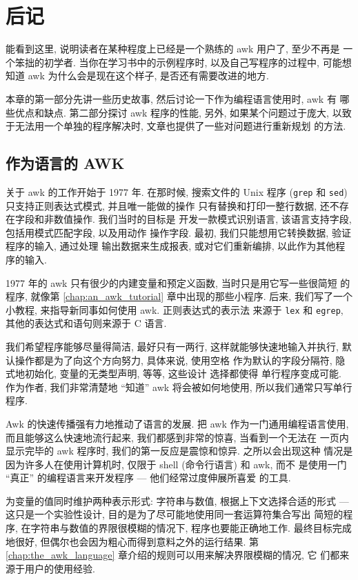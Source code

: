 \chapter{后记}
\label{chap:epilog}

能看到这里, 说明读者在某种程度上已经是一个熟练的 awk 用户了, 至少不再是
一个笨拙的初学者. 当你在学习书中的示例程序时, 以及自己写程序的过程中, 
可能想知道 awk 为什么会是现在这个样子, 是否还有需要改进的地方.

本章的第一部分先讲一些历史故事, 然后讨论一下作为编程语言使用时, awk 有
哪些优点和缺点. 第二部分探讨 awk 程序的性能, 另外, 如果某个问题过于庞大,
以致于无法用一个单独的程序解决时, 文章也提供了一些对问题进行重新规划
的方法.

\section{作为语言的 AWK}
\label{sec:awk_as_a_language}

关于 awk 的工作开始于 1977 年. 在那时候, 搜索文件的 Unix 程序
(\texttt{grep} 和 \texttt{sed}) 只支持正则表达式模式, 并且唯一能做的操作
只有替换和打印一整行数据, 还不存在字段和非数值操作. 我们当时的目标是
开发一款模式识别语言, 该语言支持字段, 包括用模式匹配字段, 以及用动作
操作字段. 最初, 我们只能想用它转换数据, 验证程序的输入, 通过处理
输出数据来生成报表, 或对它们重新编排, 以此作为其他程序的输入.

1977 年的 awk 只有很少的内建变量和预定义函数, 当时只是用它写一些很简短
的程序, 就像第 \ref{chap:an_awk_tutorial} 章中出现的那些小程序. 后来,
我们写了一个小教程, 来指导新同事如何使用 awk. 正则表达式的表示法
来源于 \texttt{lex} 和 \texttt{egrep}, 其他的表达式和语句则来源于 C
语言.

我们希望程序能够尽量得简洁, 最好只有一两行, 这样就能够快速地输入并执行,
    默认操作都是为了向这个方向努力, 具体来说, 使用空格
作为默认的字段分隔符, 隐式地初始化, 变量的无类型声明, 等等, 这些设计
选择都使得 单行程序变成可能. 作为作者, 我们非常清楚地 ``知道'' awk
将会被如何地使用, 所以我们通常只写单行程序.

Awk 的快速传播强有力地推动了语言的发展. 把 awk 作为一门通用编程语言使用,
而且能够这么快速地流行起来, 我们都感到非常的惊喜, 当看到一个无法在
一页内显示完毕的 awk 程序时, 我们的第一反应是震惊和惊异. 之所以会出现这种
情况是因为许多人在使用计算机时, 仅限于 shell (命令行语言) 和 awk, 而不
是使用一门 ``真正'' 的编程语言来开发程序 --- 他们经常过度伸展所喜爱
的工具.

为变量的值同时维护两种表示形式: 字符串与数值, 根据上下文选择合适的形式
--- 这只是一个实验性设计, 目的是为了尽可能地使用同一套运算符集合写出
简短的程序, 在字符串与数值的界限很模糊的情况下, 程序也要能正确地工作.
最终目标完成地很好, 但偶尔也会因为粗心而得到意料之外的运行结果. 第 
\ref{chap:the_awk_language} 章介绍的规则可以用来解决界限模糊的情况, 它
们都来源于用户的使用经验.

